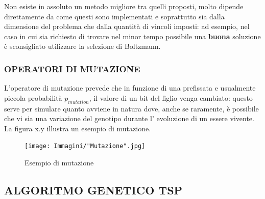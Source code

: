 \documentclass[11pt]{article}
\begin{document}
Non esiste in assoluto un metodo migliore tra quelli proposti, molto dipende direttamente da come questi sono implementati e soprattutto sia dalla dimensione del problema che dalla quantità di vincoli imposti: ad esempio, nel caso in cui sia richiesto di trovare nel minor tempo possibile una \textbf{buona} soluzione è sconsigliato utilizzare la selezione di Boltzmann.

\subsubsection*{OPERATORI DI MUTAZIONE}

L'operatore di mutazione prevede che in funzione di una prefissata e usualmente piccola probabilità $p_{mutation}$, il valore di un bit del figlio venga cambiato: questo serve per simulare quanto avviene in natura dove, anche se raramente, è possibile che vi sia una variazione del genotipo durante l' evoluzione di un essere vivente.
La figura x.y illustra un esempio di mutazione.

\begin{figure}[htbp]
    \centering
    \texttt{[image: Immagini/"Mutazione".jpg]}
    \caption{Esempio di mutazione}
\end{figure}

\subsection{ALGORITMO GENETICO TSP}
\end{document}

